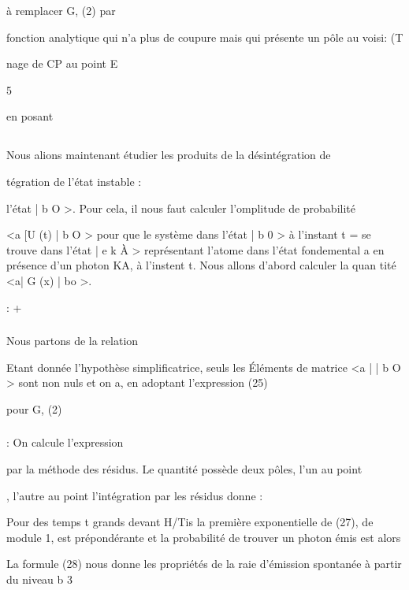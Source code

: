 à remplacer G, (2) par


fonction analytique qui n'a plus de coupure mais qui présente un pôle au voisi: (T

nage de CP au point E

5

en posant 

\subsection{}%

Nous alions maintenant étudier les produits de la désintégration de

tégration de l'état instable :



l'état | b O >. Pour cela, il nous faut calculer l'omplitude de probabilité

<a  [U (t) | b O > pour que le système dans l'état | b 0 > à l'instant t =
se trouve dans l'état | e k À > représentant l'atome dans l'état fondemental a
en présence d'un photon KA, à l'instent t. Nous allons d'abord calculer la quan
tité <a| G (x) | bo >.


: +
\subsubsection{}%

Nous partons de la relation

Etant donnée l'hypothèse simplificatrice, seuls les Éléments de matrice
<a | | b O > sont non nuls et on a, en adoptant l'expression (25)

pour G, (2)



\subsubsection{}%
: On calcule l'expression

par la méthode des résidus.
Le quantité  possède deux pôles, l'un au point

, l'autre au point  l'intégration par les résidus
donne :

Pour des temps t grands devant H/Tis la première exponentielle
de (27), de module 1, est prépondérante et la probabilité de trouver un photon
 émis est alors


La formule (28) nous donne les propriétés de la raie d'émission spontanée à partir du niveau b 3

